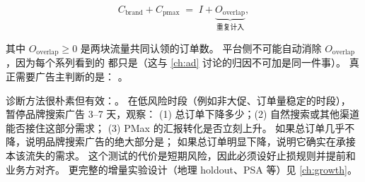 \begin{equation}
C_{\text{brand}} + C_{\text{pmax}} \;=\; I + \underbrace{O_{\text{overlap}}}_{\text{重复计入}} ,
\label{eq:g-overlap}
\end{equation}

其中 $O_{\text{overlap}} \ge 0$ 是两块流量共同认领的订单数。
平台侧不可能自动消除 $O_{\text{overlap}}$，因为每个系列看到的
都只是（这与 \cref{ch:ad} 讨论的归因不可加是同一件事）。
真正需要广告主判断的是：
。

诊断方法很朴素但有效：。
在低风险时段（例如非大促、订单量稳定的时段），
暂停品牌搜索广告 3--7 天，观察：
(1) 总订单下降多少；(2) 自然搜索或其他渠道能否接住这部分需求；
(3) PMax 的汇报转化是否立刻上升。
如果总订单几乎不降，说明品牌搜索广告的绝大部分是；
如果总订单明显下降，说明它确实在承接本该流失的需求。
这个测试的代价是短期风险，因此必须设好止损规则并提前和业务方对齐。
更完整的增量实验设计（地理 holdout、PSA 等）见 \cref{ch:growth}。


